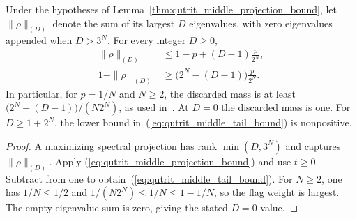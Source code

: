 \begin{lemma}
    \label{thm:qutrit_middle_discarded_mass}
    \leanok
    Under the hypotheses of Lemma~\ref{thm:qutrit_middle_projection_bound},
    let $\|\rho\|_{(D)}$ denote the sum of its largest $D$ eigenvalues,
    with zero eigenvalues appended when $D>3^N$.
    For every integer $D\ge0$,
    \begin{align}
        \|\rho\|_{(D)}   & \le1-p+(D-1)\frac{p}{2^N},
        \label{eq:qutrit_middle_kyfan_bound}                      \\
        1-\|\rho\|_{(D)} & \ge\bigl(2^N-(D-1)\bigr)\frac{p}{2^N}.
        \label{eq:qutrit_middle_tail_bound}
    \end{align}
    In particular, for $p=1/N$ and $N\ge2$, the discarded mass is at least
    $\bigl(2^N-(D-1)\bigr)/(N2^N)$, as used
    in~\cite{Schuch2008EntropyScaling}.
    At $D=0$ the discarded mass is one. For $D\ge1+2^N$, the lower
    bound in~(\ref{eq:qutrit_middle_tail_bound}) is nonpositive.
\end{lemma}
\begin{proof}\leanok
    A maximizing spectral projection has rank $\min(D,3^N)$ and
    captures $\|\rho\|_{(D)}$. Apply
    (\ref{eq:qutrit_middle_projection_bound}) and use $t\ge0$.
    Subtract from one to obtain~(\ref{eq:qutrit_middle_tail_bound}).
    For $N\ge2$, one has $1/N\le1/2$ and
    $1/(N2^N)\le1/N\le1-1/N$, so the flag weight is largest.
    The empty eigenvalue sum is zero, giving the stated $D=0$ value.
\end{proof}
